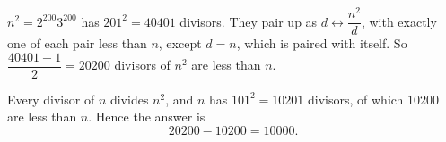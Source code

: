 $n^2=2^{200}3^{200}$ has $201^2=40401$ divisors. They pair up as $d\leftrightarrow\dfrac{n^2}{d}$, with exactly one of each pair less than $n$, except $d=n$, which is paired with itself. So $\dfrac{40401-1}{2}=20200$ divisors of $n^2$ are less than $n$.

Every divisor of $n$ divides $n^2$, and $n$ has $101^2=10201$ divisors, of which $10200$ are less than $n$. Hence the answer is
\[20200-10200=\boxed{10000}.\]
